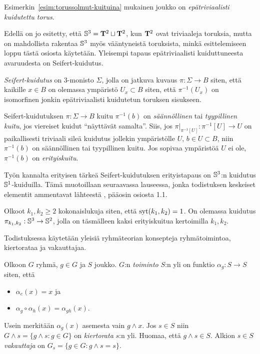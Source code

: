 \begin{maaritelma}
    Esimerkin~\ref{esim:torussolmut-kuituina} mukainen joukko on \emph{epätriviaalisti kuidutettu torus}.
\end{maaritelma}
Edellä on jo esitetty, että $\S^3=\TT^2\sqcup\TT^2$, kun $\TT^2$ ovat triviaaleja toruksia, mutta on mahdollista rakentaa $\S^3$ myös vääntyneistä toruksista, minkä esittelemiseen loppu tästä osiosta käytetään. Yleisempi tapaus epätriviaalisti kuiduttuneesta avaruudesta on Seifert-kuidutus.
\begin{maaritelma}
    \emph{Seifert-kuidutus} on 3-monisto $\Sigma$, jolla on jatkuva kuvaus $\pi:\Sigma\to B$ siten, että kaikille $x\in B$ on olemassa ympäristö $U_x\subset B$ siten, että $\pi^{-1}(U_x)$ on isomorfinen jonkin epätriviaalisti kuidutetun toruksen sisukseen.
\end{maaritelma}
\begin{maaritelma}
    Seifert-kuidutuksen $\pi:\Sigma\to B$ kuitu $\pi^{-1}(b)$ on \emph{säännöllinen} tai \emph{tyypillinen kuitu}, jos viereiset kuidut ``näyttävät samalta''. Siis, jos $\pi\vert_{\pi^{-1}[U]}:\pi^{-1}[U]\to U$ on paikallisesti triviaali sileä kuidutus jollekin ympäristölle $U$, $b\in U\subset B$, niin $\pi^{-1}(b)$ on säännöllinen tai tyypillinen kuitu. Jos sopivaa ympäristöä $U$ ei ole, $\pi^{-1}(b)$ on \emph{erityiskuitu}.
\end{maaritelma}
Työn kannalta erityisen tärkeä Seifert-kuidutuksen erityistapaus on $\S^3$:n kuidutus $\S^1$-kuiduilla. Tämä muotoillaan seuraavassa lauseessa, jonka todistuksen keskeiset elementit ammentavat lähteestä \citep{Saveliev2002}, pääosin osiosta 1.1.
\begin{lause}
    Olkoot $k_1,k_2\geq2$ kokonaislukuja siten, että $\syt(k_1,k_2)=1$. On olemassa kuidutus $\pi_{k_1,k_2}:\S^3\to\S^2$, jolla on täsmälleen kaksi erityiskuitua kertoimilla $k_1,k_2$.
    \label{lause:s3-kuidutus}
\end{lause}
Todistuksessa käytetään yleisiä ryhmäteorian konsepteja ryhmätoimintoa, kiertorataa ja vakauttajaa.
\begin{maaritelma}
    Olkoon $G$ ryhmä, $g\in G$ ja $S$ joukko. $G$:n \emph{toiminto} $S$:n yli on funktio $\alpha_g:S\to S$ siten, että
    \begin{itemize}
        \item $\alpha_e(x)=x$ ja
        \item $\alpha_g\circ\alpha_h(x)=\alpha_{gh}(x)$.
    \end{itemize}
    Usein merkitään $\alpha_g(x)$ asemesta vain $g\wedge x$. Jos $s\in S$ niin $G\wedge s=\{g\wedge s:g\in G\}$ on \emph{kiertorata} $s$:n yli. Huomaa, että $g\wedge s\in S$. Alkion $s\in S$ \emph{vakauttaja} on $G_s=\{g\in G:g\wedge s=s\}$.
\end{maaritelma}
